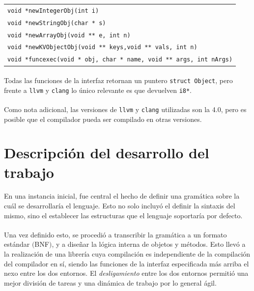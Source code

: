 \documentclass[12pt]{article}
\begin{document}
	\begin{center}
		\begin{tabular}{ l }			
			\verb|void *newIntegerObj(int i)| \\
			\verb|void *newStringObj(char * s)| \\
			\verb|void *newArrayObj(void ** e, int n)| \\
			\verb|void *newKVObjectObj(void ** keys,void ** vals, int n)| \\
			\verb|void *funcexec(void * obj, char * name, void ** args, int nArgs)| \\
		\end{tabular}
	\end{center}
	
	\paragraph{} Todas las funciones de la interfaz retornan un puntero \verb|struct Object|, pero frente a \verb|llvm| y \verb|clang| lo único relevante es que devuelven \verb|i8*|.
	
	\paragraph{} Como nota adicional, las versiones de \verb|llvm| y \verb|clang| utilizadas son la 4.0, pero es posible que el compilador pueda ser compilado en otras versiones.
	
	\section{Descripción del desarrollo del trabajo}
	
	\paragraph{} En una instancia inicial, fue central el hecho de definir una gramática sobre la cuál se desarrollaría el lenguaje. Esto no solo incluyó el definir la sintaxis del mismo, sino el establecer las estructuras que el lenguaje soportaría por defecto.
	
	\paragraph{} Una vez definido esto, se procedió a transcribir la gramática a un formato estándar $($BNF$)$, y a diseñar la lógica interna de objetos y métodos. Esto llevó a la realización de una librería cuya compilación es independiente de la compilación del compilador en sí, siendo las funciones de la interfaz especificada más arriba el nexo entre los dos entornos. El \textit{desligamiento} entre los dos entornos permitió una mejor división de tareas y una dinámica de trabajo por lo general ágil.
	
\end{document}
